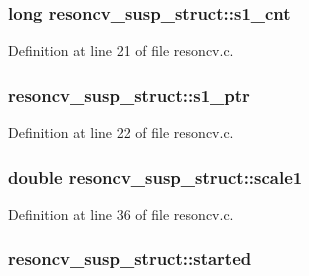 \subsubsection[{\texorpdfstring{s1\+\_\+cnt}{s1_cnt}}]{\setlength{\rightskip}{0pt plus 5cm}long resoncv\+\_\+susp\+\_\+struct\+::s1\+\_\+cnt}\hypertarget{structresoncv__susp__struct_a606045473d8e6719350e1c16c9047bd4}{}\label{structresoncv__susp__struct_a606045473d8e6719350e1c16c9047bd4}


Definition at line 21 of file resoncv.\+c.

\subsubsection[{\texorpdfstring{s1\+\_\+ptr}{s1_ptr}}]{ resoncv\+\_\+susp\+\_\+struct\+::s1\+\_\+ptr}\hypertarget{structresoncv__susp__struct_aa9b69741aad583a0cae82986f0403da2}{}\label{structresoncv__susp__struct_aa9b69741aad583a0cae82986f0403da2}


Definition at line 22 of file resoncv.\+c.

\subsubsection[{\texorpdfstring{scale1}{scale1}}]{\setlength{\rightskip}{0pt plus 5cm}double resoncv\+\_\+susp\+\_\+struct\+::scale1}\hypertarget{structresoncv__susp__struct_aff019aa0fa5e5042fff7593aa359d55b}{}\label{structresoncv__susp__struct_aff019aa0fa5e5042fff7593aa359d55b}


Definition at line 36 of file resoncv.\+c.

\subsubsection[{\texorpdfstring{started}{started}}]{ resoncv\+\_\+susp\+\_\+struct\+::started}\hypertarget{structresoncv__susp__struct_ab91e6bc2f41a3ce497159a5f47e2ec9a}{}\label{structresoncv__susp__struct_ab91e6bc2f41a3ce497159a5f47e2ec9a}


